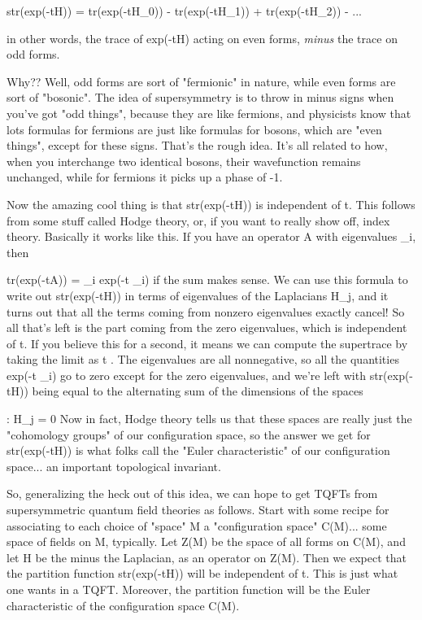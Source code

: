 str(exp(-tH)) = tr(exp(-tH_{0})) - tr(exp(-tH_{1})) + 
tr(exp(-tH_{2})) - ...

in other words, the trace of exp(-tH) acting on even forms,
\emph{minus} the trace on odd forms.  

Why??  Well, odd forms are sort of "fermionic" in nature, while
even forms are sort of "bosonic".  The idea of supersymmetry
is to throw in minus signs when you've got "odd things", because
they are like fermions, and physicists know that lots formulas
for fermions are just like formulas for bosons, which are "even
things", except for these signs.  That's the rough idea.  It's all
related to how, when you interchange two identical bosons, their
wavefunction remains unchanged, while for fermions it picks up
a phase of -1.

Now the amazing cool thing is that str(exp(-tH)) is independent
of t.  This follows from some stuff called Hodge theory, or, if
you want to really show off, index theory.   Basically it works
like this.  If you have an operator A with eigenvalues \lambda _i,
then 

                 tr(exp(-tA)) = \sum_{i} exp(-t \lambda _{i})
if the sum makes sense.  We can use this formula to write out
str(exp(-tH)) in terms of eigenvalues of the Laplacians H_{j},
and it turns out that all the terms coming from nonzero eigenvalues
exactly cancel!  So all that's left is the part coming from the
zero eigenvalues, which is independent of t.  If you believe 
this for a second, it means we can compute the supertrace by taking 
the limit as t \to  \infty .  The eigenvalues are all nonnegative,
so all the quantities exp(-t \lambda _{i}) go to zero except for the
zero eigenvalues, and we're left with str(exp(-tH)) being equal to
the alternating sum of the dimensions of the spaces

                  {\psi  : H_{j} \psi  = 0}
Now in fact, Hodge theory tells us that these spaces are really just 
the "cohomology groups" of our configuration space, so the answer we
get for str(exp(-tH)) is what folks call the "Euler characteristic" of our 
configuration space... an important topological invariant.   

So, generalizing the heck out of this idea, we can hope to get
TQFTs from supersymmetric quantum field theories as follows.
Start with some recipe for associating to each choice of "space"
M a "configuration space" C(M)... some space of fields on M,
typically.  Let Z(M) be the space of all forms on C(M), and
let H be the minus the Laplacian, as an operator on Z(M).  Then we expect
that the partition function  str(exp(-tH))  will be independent of
t.  This is just what one wants in a TQFT.  Moreover, the partition 
function will be the Euler characteristic of the configuration space C(M).  


